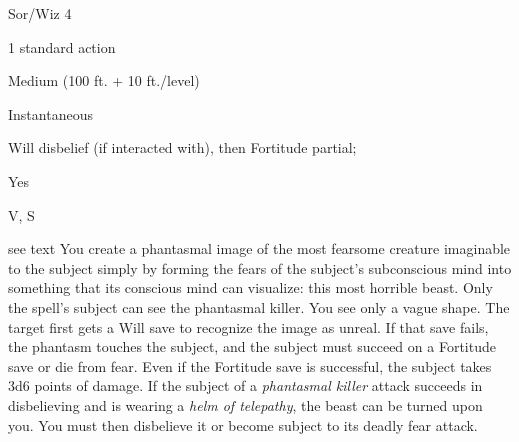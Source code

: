 
\begin{description*}
\item[Level:] Sor/Wiz 4
\item[Casting Time:] 1 standard action
\item[Range:] Medium (100 ft. + 10 ft./level)
\item[Duration:] Instantaneous
\item[Saving Throw:] Will disbelief (if interacted with), then Fortitude partial;
\item[Spell Resistance:] Yes
\item[Components:] V, S
\end{description*}

see text
You create a phantasmal image of the most fearsome creature imaginable to the subject
simply by forming the fears of the subject's subconscious mind into something that
its conscious mind can visualize: this most horrible beast. Only the spell's subject
can see the phantasmal killer. You see only a vague shape. The target first gets
a Will save to recognize the image as unreal. If that save fails, the phantasm
touches the subject, and the subject must succeed on a Fortitude save or die from
fear. Even if the Fortitude save is successful, the subject takes 3d6 points of
damage.
If the subject of a \textit{phantasmal killer} attack succeeds in disbelieving
and is wearing a \textit{helm of telepathy}, the beast can be turned upon you.
You must then disbelieve it or become subject to its deadly fear attack.